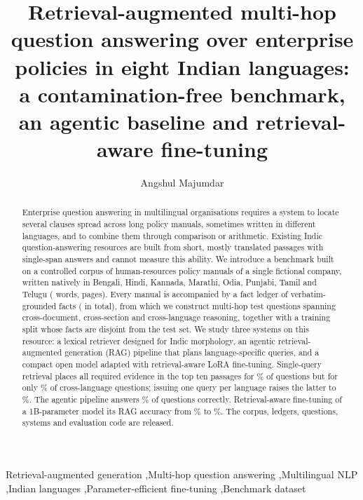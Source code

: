 \documentclass[preprint,12pt]{elsarticle}
\begin{document}
\begin{frontmatter}

\title{Retrieval-augmented multi-hop question answering over enterprise policies in eight Indian languages:\\ a contamination-free benchmark, an agentic baseline and retrieval-aware fine-tuning}

\author{Angshul Majumdar}

\begin{abstract}
Enterprise question answering in multilingual organisations requires a system to locate several clauses spread across long policy manuals, sometimes written in different languages, and to combine them through comparison or arithmetic. Existing Indic question-answering resources are built from short, mostly translated passages with single-span answers and cannot measure this ability. We introduce a benchmark built on a controlled corpus of \NDocs{} human-resources policy manuals of a single fictional company, written natively in Bengali, Hindi, Kannada, Marathi, Odia, Punjabi, Tamil and Telugu (\NWords{} words, \NPages{} pages). Every manual is accompanied by a fact ledger of verbatim-grounded facts (\NFacts{} in total), from which we construct \NTest{} multi-hop test questions spanning cross-document, cross-section and cross-language reasoning, together with a training split whose facts are disjoint from the test set. We study three systems on this resource: a lexical retriever designed for Indic morphology, an agentic retrieval-augmented generation (RAG) pipeline that plans language-specific queries, and a compact open model adapted with retrieval-aware LoRA fine-tuning. Single-query retrieval places all required evidence in the top ten passages for \RAllTen\% of questions but for only \RXLTen\% of cross-language questions; issuing one query per language raises the latter to \RXLLFTen\%. The agentic pipeline answers \AStrict\% of questions correctly. Retrieval-aware fine-tuning of a 1B-parameter model \FTVerbRag{} its RAG accuracy from \FTBaseRag\% to \FTTunedRag\%. The corpus, ledgers, questions, systems and evaluation code are released.
\end{abstract}

\begin{keyword}
Retrieval-augmented generation \sep Multi-hop question answering \sep Multilingual NLP \sep Indian languages \sep Parameter-efficient fine-tuning \sep Benchmark dataset
\end{keyword}

\end{frontmatter}
\end{document}

